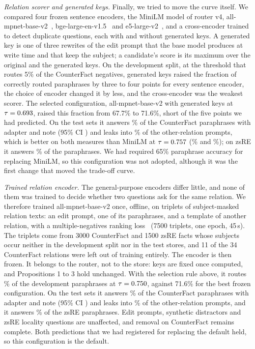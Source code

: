 \documentclass[journal,10pt]{IEEEtran}
\begin{document}
\emph{Relation scorer and generated keys.} Finally, we tried to move the curve itself.
We compared four frozen sentence encoders, the MiniLM model of router v4,
all-mpnet-base-v2~\cite{song2020mpnet}, bge-large-en-v1.5~\cite{xiao2024cpack} and
e5-large-v2~\cite{wang2022e5}, and a cross-encoder trained to detect duplicate questions,
each with and without generated keys. A generated key is one of three rewrites of the
edit prompt that the base model produces at write time and that keep the subject; a
candidate's score is its maximum over the original and the generated keys. On the
development split, at the threshold that routes 5\% of the CounterFact negatives,
generated keys raised the fraction of correctly routed paraphrases by three to four
points for every sentence encoder, the choice of encoder changed it by less, and the
cross-encoder was the weakest scorer. The selected configuration, all-mpnet-base-v2 with
generated keys at $\tau=0.693$, raised this fraction from 67.7\% to 71.6\%, short of
the five points we had predicted. On the test sets it answers \wCfParaBothPct\% of the
CounterFact paraphrases with adapter and note (95\% CI \wCfParaBothCIPct) and leaks into
\wCfEthreeLeakBothPct\% of the other-relation prompts, which is better on both measures
than MiniLM at $\tau=0.757$ (\sCfParaBothPct\% and \sCfEthreeLeakBothPct\%); on zsRE it
answers \wZsParaBothPct\% of the paraphrases. We had required 65\% paraphrase accuracy
for replacing MiniLM, so this configuration was not adopted, although it was the first
change that moved the trade-off curve.



\emph{Trained relation encoder.} The general-purpose encoders differ little, and none of
them was trained to decide whether two questions ask for the same relation. We therefore
trained all-mpnet-base-v2 once, offline, on triplets of subject-masked relation texts:
an edit prompt, one of its paraphrases, and a template of another relation, with a
multiple-negatives ranking loss~\cite{henderson2017efficient} (7500 triplets, one epoch,
45\,s). The triplets come from 3000 CounterFact and 1500 zsRE facts whose subjects occur
neither in the development split nor in the test stores, and 11 of the 34 CounterFact
relations were left out of training entirely. The encoder is then frozen. It belongs to
the router, not to the store: keys are fixed once computed, and Propositions 1 to 3 hold
unchanged. With the selection rule above, it routes \xDevTprPct\% of the development
paraphrases at $\tau=0.750$, against 71.6\% for the best frozen configuration. On the
test sets it answers \xCfParaBothPct\% of the CounterFact paraphrases with adapter and
note (95\% CI \xCfParaBothCIPct) and leaks into \xCfEthreeLeakBothPct\% of the
other-relation prompts, and it answers \xZsParaBothPct\% of the zsRE paraphrases. Edit
prompts, synthetic distractors and zsRE locality questions are unaffected, and removal
on CounterFact remains complete. Both predictions that we had registered for replacing
the default held, so this configuration is the default.
\end{document}
